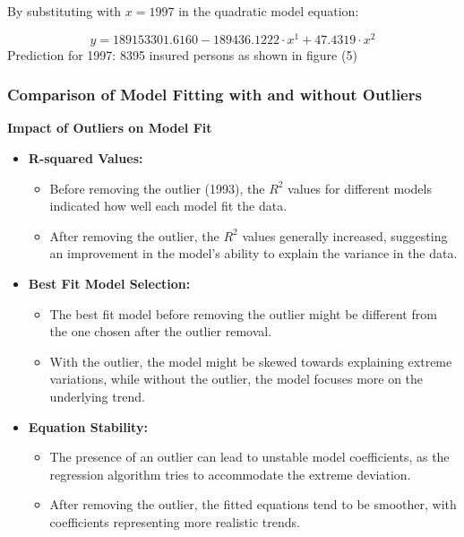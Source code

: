 \documentclass[12pt]{article}
\begin{document}
By substituting with \( x = 1997 \) in the quadratic model equation:

\[
y = 189153301.6160 - 189436.1222 \cdot x^1 + 47.4319 \cdot x^2 
\]
Prediction for 1997: 8395 insured persons as shown in figure (5)
\newpage
\subsubsection*{Comparison of Model Fitting with and without Outliers}
\textbf{Impact of Outliers on Model Fit}

\begin{itemize}
    \item \textbf{R-squared Values:}
    \begin{itemize}
        \item Before removing the outlier (1993), the \( R^2 \) values for different models indicated how well each model fit the data.
        \item After removing the outlier, the \( R^2 \) values generally increased, suggesting an improvement in the model’s ability to explain the variance in the data.
    \end{itemize}

    \item \textbf{Best Fit Model Selection:}
    \begin{itemize}
        \item The best fit model before removing the outlier might be different from the one chosen after the outlier removal.
        \item With the outlier, the model might be skewed towards explaining extreme variations, while without the outlier, the model focuses more on the underlying trend.
    \end{itemize}

    \item \textbf{Equation Stability:}
    \begin{itemize}
        \item The presence of an outlier can lead to unstable model coefficients, as the regression algorithm tries to accommodate the extreme deviation.
        \item After removing the outlier, the fitted equations tend to be smoother, with coefficients representing more realistic trends.
    \end{itemize}


\end{itemize}
\end{document}
